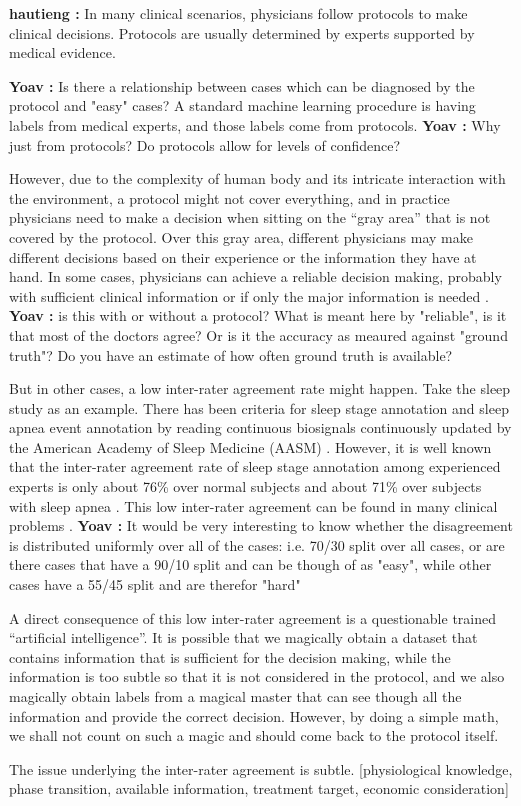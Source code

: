 \documentclass[fleqn,10pt]{wlscirep}
\newcommand{\comment}[3]{{\color{#1} {\bf #2 :} #3}}
\newcommand{\hautieng}[1]{\comment{blue}{hautieng}{#1}}
\newcommand{\yoav}[1]{\comment{red}{Yoav}{#1}}
\begin{document}
\hautieng{
In many clinical scenarios, physicians follow protocols to make clinical decisions. Protocols are usually determined by experts supported by medical evidence. 

\yoav{Is there a relationship between cases which can be diagnosed by the protocol and "easy" cases?}
%
A standard machine learning procedure is having labels from medical experts, and those labels come from protocols.
\yoav{Why just from protocols? Do protocols allow for levels of confidence?}

However, due to the complexity of human body and its intricate interaction with the environment, a protocol might not cover everything,
\Yoav{Do you mean all patients?}
and in practice physicians need to make a decision when sitting on the ``gray area'' that is not covered by the protocol. Over this gray area, different physicians may make different decisions based on their experience or the information they have at hand. In some cases, physicians can achieve a reliable decision making, probably with sufficient clinical information \cite{mehta2011agreement} or if only the major information is needed \cite{atiya2003interobserver}. 
\yoav{is this with or without a protocol? What is meant here by "reliable", is it that most of the doctors agree? Or is it the accuracy as meaured against "ground truth"?  Do you have an estimate of how often ground truth is available?}

But in other cases, a low inter-rater agreement rate might happen. Take the sleep study as an example. There has been criteria for sleep stage annotation and sleep apnea event annotation by reading continuous biosignals continuously updated by the American Academy of Sleep Medicine (AASM) \cite{Iber2007,berry2012aasm}. However, it is well known that the inter-rater agreement rate of sleep stage annotation among experienced experts is only about 76\% over normal subjects and about 71\% over subjects with sleep apnea \cite{norman2000interobserver}. This low inter-rater agreement can be found in many clinical problems \cite{brosnan2015modest,venhola2003interobserver,moncada2011reading}. 
\yoav{It would be very interesting to know whether the disagreement is distributed uniformly over all of the cases: i.e. 70/30 split over all cases, or are there cases that have a 90/10 split and can be though of as "easy", while other cases have a 55/45 split and are therefor "hard"}

A direct consequence of this low inter-rater agreement is a questionable trained ``artificial intelligence''. It is possible that we magically obtain a dataset that contains information that is sufficient for the decision making, while the information is too subtle so that it is not considered in the protocol, and we also magically obtain labels from a magical master that can see though all the information and provide the correct decision. However, by doing a simple math, we shall not count on such a magic and should come back to the protocol itself.

The issue underlying the inter-rater agreement is subtle. [physiological knowledge, phase transition, available information, treatment target, economic consideration]}
\end{document}
